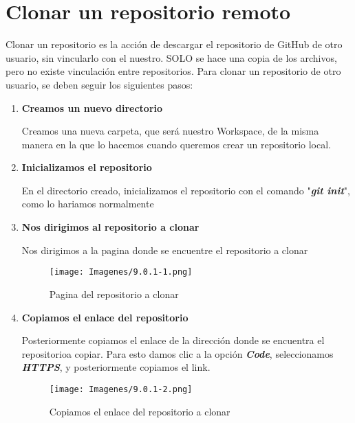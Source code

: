\chapter{Clonar un repositorio remoto}

Clonar un repositorio es la acción de descargar el repositorio de GitHub de otro usuario, sin vincularlo con el nuestro. SOLO se hace una copia de los archivos, pero no existe vinculación entre repositorios. Para clonar un repositorio de otro usuario, se deben seguir los siguientes pasos:

\begin{enumerate}
    \item \textbf{Creamos un nuevo directorio}
    
    Creamos una nueva carpeta, que será nuestro Workspace, de la misma manera en la que lo hacemos cuando queremos crear un repositorio local.
    
    \item \textbf{Inicializamos el repositorio}
    
    En el directorio creado, inicializamos el repositorio con el comando "\textbf{\textit{git init}}", como lo hariamos normalmente

    \item \textbf{Nos dirigimos al repositorio a clonar}

    Nos dirigimos a la pagina donde se encuentre el repositorio a clonar

    \begin{figure}[H]
        \centering
        \texttt{[image: Imagenes/9.0.1-1.png]}
        \caption{Pagina del repositorio a clonar}
        \label{}
     \end{figure}

    \item \textbf{Copiamos el enlace del repositorio}

    Posteriormente copiamos el enlace de la dirección donde se encuentra el repositorioa copiar. Para esto damos clic a la opción \textbf{\textit{Code}}, seleccionamos \textbf{\textit{HTTPS}}, y posteriormente copiamos el link.

    \begin{figure}[H]
        \centering
        \texttt{[image: Imagenes/9.0.1-2.png]}
        \caption{Copiamos el enlace del repositorio a clonar}
        \label{}
     \end{figure} 
    
\end{enumerate}
